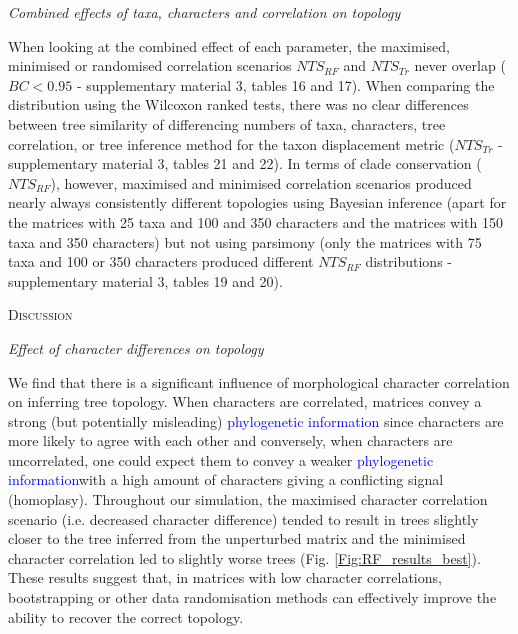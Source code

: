 \documentclass[12pt,letterpaper]{article}
\renewcommand{\section}[1]{%
\bigskip
\begin{center}
\begin{Large}
\normalfont\scshape #1
\medskip
\end{Large}
\end{center}}
\renewcommand{\subsection}[1]{%
\bigskip
\begin{center}
\begin{large}
\normalfont\itshape #1
\end{large}
\end{center}}
\begin{document}
\subsection{Combined effects of taxa, characters and correlation on topology}
When looking at the combined effect of each parameter, the maximised, minimised or randomised correlation scenarios $NTS_{RF}$ and $NTS_{Tr}$ never overlap ($BC < 0.95$ - supplementary material 3, tables 16 and 17).
When comparing the distribution using the Wilcoxon ranked tests, there was no clear differences between tree similarity of differencing numbers of taxa, characters, tree correlation, or tree inference method for the taxon displacement metric ($NTS_{Tr}$ - supplementary material 3, tables 21 and 22).
In terms of clade conservation ($NTS_{RF}$), however, maximised and minimised correlation scenarios produced nearly always consistently different topologies using Bayesian inference (apart for the matrices with 25 taxa and 100 and 350 characters and the matrices with 150 taxa and 350 characters) but not using parsimony (only the matrices with 75 taxa and 100 or 350 characters produced different $NTS_{RF}$ distributions - supplementary material 3, tables 19 and 20).

%
%
\section{Discussion}

\subsection{Effect of character differences on topology}
We find that there is a significant influence of morphological character correlation on inferring tree topology.
When characters are correlated, matrices convey a strong (but potentially misleading) \textcolor{blue}{phylogenetic information} since characters are more likely to agree with each other and conversely, when characters are uncorrelated, one could expect them to convey a weaker \textcolor{blue}{phylogenetic information}with a high amount of characters giving a conflicting signal (homoplasy).
Throughout our simulation, the maximised character correlation scenario (i.e. decreased character difference) tended to result in trees slightly closer to the tree inferred from the unperturbed matrix and the minimised character correlation led to slightly worse trees (Fig. \ref{Fig:RF_results_best}).
These results suggest that, in matrices with low character correlations, bootstrapping or other data randomisation methods can effectively improve the ability to recover the correct topology.
\end{document}
